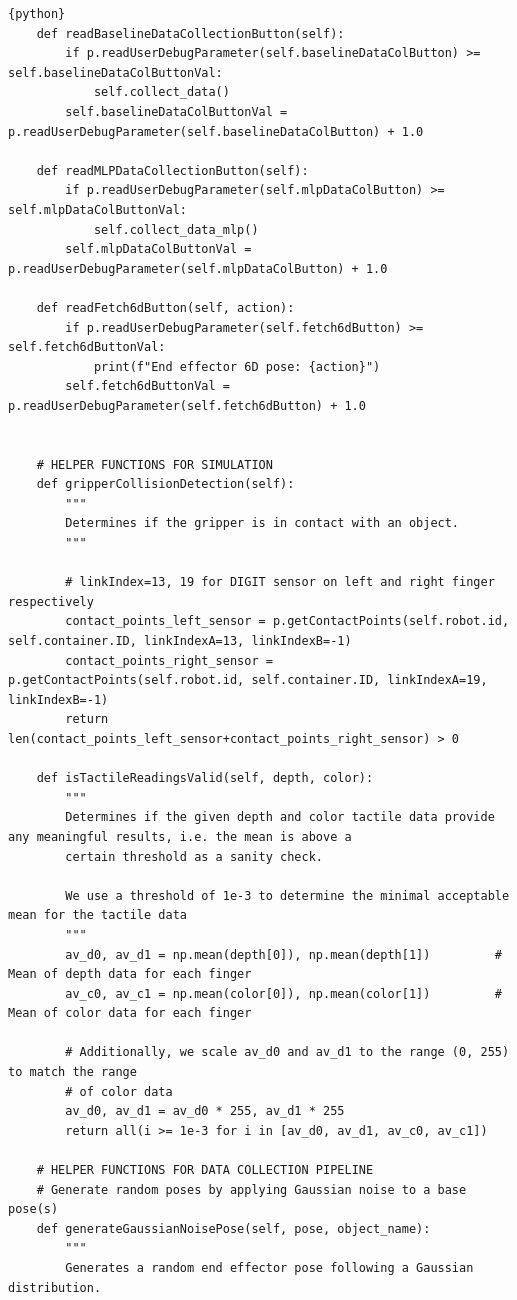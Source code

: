 \documentclass[11pt, a4paper]{report}
\begin{document}
\begin{lstlisting}{python}
    def readBaselineDataCollectionButton(self):
        if p.readUserDebugParameter(self.baselineDataColButton) >= self.baselineDataColButtonVal:
            self.collect_data()
        self.baselineDataColButtonVal = p.readUserDebugParameter(self.baselineDataColButton) + 1.0

    def readMLPDataCollectionButton(self):
        if p.readUserDebugParameter(self.mlpDataColButton) >= self.mlpDataColButtonVal:
            self.collect_data_mlp()
        self.mlpDataColButtonVal = p.readUserDebugParameter(self.mlpDataColButton) + 1.0
    
    def readFetch6dButton(self, action):        
        if p.readUserDebugParameter(self.fetch6dButton) >= self.fetch6dButtonVal:           
            print(f"End effector 6D pose: {action}")        
        self.fetch6dButtonVal = p.readUserDebugParameter(self.fetch6dButton) + 1.0


    # HELPER FUNCTIONS FOR SIMULATION
    def gripperCollisionDetection(self):
        """
        Determines if the gripper is in contact with an object.
        """

        # linkIndex=13, 19 for DIGIT sensor on left and right finger respectively
        contact_points_left_sensor = p.getContactPoints(self.robot.id, self.container.ID, linkIndexA=13, linkIndexB=-1)
        contact_points_right_sensor = p.getContactPoints(self.robot.id, self.container.ID, linkIndexA=19, linkIndexB=-1)
        return len(contact_points_left_sensor+contact_points_right_sensor) > 0
    
    def isTactileReadingsValid(self, depth, color):
        """
        Determines if the given depth and color tactile data provide any meaningful results, i.e. the mean is above a 
        certain threshold as a sanity check.

        We use a threshold of 1e-3 to determine the minimal acceptable mean for the tactile data
        """
        av_d0, av_d1 = np.mean(depth[0]), np.mean(depth[1])         # Mean of depth data for each finger
        av_c0, av_c1 = np.mean(color[0]), np.mean(color[1])         # Mean of color data for each finger
        
        # Additionally, we scale av_d0 and av_d1 to the range (0, 255) to match the range
        # of color data
        av_d0, av_d1 = av_d0 * 255, av_d1 * 255
        return all(i >= 1e-3 for i in [av_d0, av_d1, av_c0, av_c1])
    
    # HELPER FUNCTIONS FOR DATA COLLECTION PIPELINE
    # Generate random poses by applying Gaussian noise to a base pose(s)
    def generateGaussianNoisePose(self, pose, object_name):
        """
        Generates a random end effector pose following a Gaussian distribution.
        

\end{lstlisting}
\end{document}
